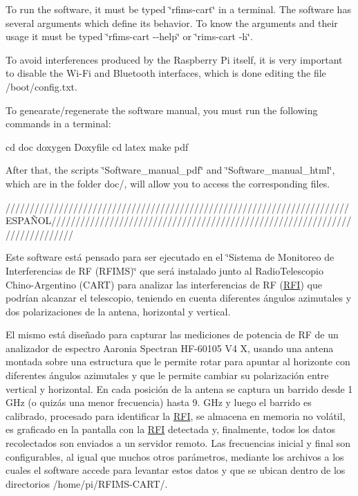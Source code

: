 To run the software, it must be typed \char`\"{}rfims-\/cart\char`\"{} in a terminal. The software has several arguments which define its behavior. To know the arguments and their usage it must be typed \char`\"{}rfims-\/cart -\/-\/help\char`\"{} or \char`\"{}rims-\/cart -\/h\char`\"{}.

To avoid interferences produced by the Raspberry Pi itself, it is very important to disable the Wi-\/\+Fi and Bluetooth interfaces, which is done editing the file /boot/config.txt.

To genearate/regenerate the software manual, you must run the following commands in a terminal\+: \begin{DoxyVerb}cd doc
doxygen Doxyfile
cd latex
make pdf
\end{DoxyVerb}


After that, the scripts \char`\"{}\+Software\+\_\+manual\+\_\+pdf\char`\"{} and \char`\"{}\+Software\+\_\+manual\+\_\+html\char`\"{}, which are in the folder doc/, will allow you to access the corresponding files.

///////////////////////////////////////////////////////////////////////\+E\+S\+P\+AÑ\+O\+L////////////////////////////////////////////////////////////////////////////

Este software está pensado para ser ejecutado en el \char`\"{}\+Sistema de Monitoreo de Interferencias de R\+F (\+R\+F\+I\+M\+S)\char`\"{} que será instalado junto al Radio\+Telescopio Chino-\/\+Argentino (C\+A\+RT) para analizar las interferencias de RF (\hyperlink{structRFI}{R\+FI}) que podrían alcanzar el telescopio, teniendo en cuenta diferentes ángulos azimutales y dos polarizaciones de la antena, horizontal y vertical.

El mismo está diseñado para capturar las mediciones de potencia de RF de un analizador de espectro Aaronia Spectran H\+F-\/60105 V4 X, usando una antena montada sobre una estructura que le permite rotar para apuntar al horizonte con diferentes ángulos azimutales y que le permite cambiar su polarización entre vertical y horizontal. En cada posición de la antena se captura un barrido desde 1 G\+Hz (o quizás una menor frecuencia) hasta 9. G\+Hz y luego el barrido es calibrado, procesado para identificar la \hyperlink{structRFI}{R\+FI}, se almacena en memoria no volátil, es graficado en la pantalla con la \hyperlink{structRFI}{R\+FI} detectada y, finalmente, todos los datos recolectados son enviados a un servidor remoto. Las frecuencias inicial y final son configurables, al igual que muchos otros parámetros, mediante los archivos a los cuales el software accede para levantar estos datos y que se ubican dentro de los directorios /home/pi/\+R\+F\+I\+M\+S-\/\+C\+A\+R\+T/.

